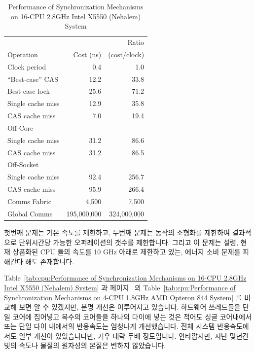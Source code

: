 {\begin{table}
\centering
\begin{tabular}{l||r|r}
				& 	 	& Ratio \\
	Operation		& Cost (ns) 	& (cost/clock) \\
	\hline
	\hline
	Clock period		&           0.4	&           1.0 \\
	\hline
	``Best-case'' CAS	&          12.2	&          33.8 \\
	\hline
	Best-case lock		&          25.6	&          71.2 \\
	\hline
	Single cache miss	&          12.9	&          35.8 \\
	\hline
	CAS cache miss		&           7.0	&          19.4 \\
	\hline
	Off-Core		&		&		\\
	\hline
	Single cache miss	&          31.2	&          86.6 \\
	\hline
	CAS cache miss		&          31.2	&          86.5 \\
	\hline
	Off-Socket		&		&		\\
	\hline
	Single cache miss	&          92.4	&         256.7 \\
	\hline
	CAS cache miss		&          95.9	&         266.4 \\
	\hline
	Comms Fabric		&       4,500	&       7,500 \\
	\hline
	Global Comms		& 195,000,000	& 324,000,000 \\
\end{tabular}
\caption{Performance of Synchronization Mechanisms on 16-CPU 2.8GHz Intel X5550 (Nehalem) System}
\label{tab:cpu:Performance of Synchronization Mechanisms on 16-CPU 2.8GHz Intel X5550 (Nehalem) System}
\end{table}

	첫번째 문제는 기본 속도를 제한하고, 두번째 문제는 동작의 소형화를
	제한하여 결과적으로 단위시간당 가능한 오퍼레이션의 갯수를 제한합니다.
	그리고 이 문제는 설령, 현재 상품화된 CPU 들의 속도를 10 GHz 아래로
	제한하고 있는, 에너지 소비 문제를 피해간다 해도 존재합니다.

	Table~\ref{tab:cpu:Performance of Synchronization Mechanisms on 16-CPU
	2.8GHz Intel X5550 (Nehalem) System} 과
	페이지~\pageref{tab:cpu:Performance of Synchronization Mechanisms on
	4-CPU 1.8GHz AMD Opteron 844 System} 의 Table~\ref{tab:cpu:Performance
	of Synchronization Mechanisms on 4-CPU 1.8GHz AMD Opteron 844 System}
	를 비교해 보면 알 수 있겠지만, 분명 개선은 이루어지고 있습니다.
	하드웨어 쓰레드들을 단일 코어에 집어넣고 복수의 코어들을 하나의 다이에
	넣는 것은 적어도 싱글 코어내에서 또는 단일 다이 내에서의 반응속도는
	엄청나게 개선했습니다.
	전체 시스템 반응속도에서도 일부 개선이 있었습니다만, 겨우 대략 두배
	정도입니다.
	안타깝지만, 지난 몇년간 빛의 속도나 물질의 원자성의 본질은 변하지
	않았습니다.

}
